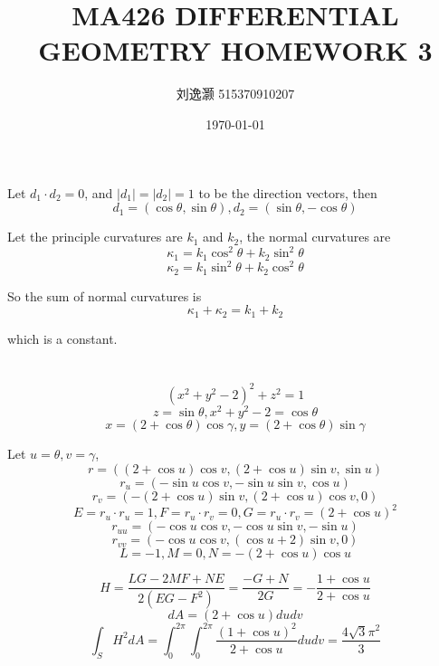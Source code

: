 \documentclass{article}
\title{MA426 DIFFERENTIAL GEOMETRY HOMEWORK 3}
\author{刘逸灏 515370910207}
\date{\today}
\begin{document}
\maketitle

\section{}
Let $d_1\cdot d_2=0$, and $|d_1|=|d_2|=1$ to be the direction vectors, then
$$d_1=(\cos\theta,\sin\theta),d_2=(\sin\theta,-\cos\theta)$$

Let the principle curvatures are $k_1$ and $k_2$, the normal curvatures are
$$\kappa_1=k_1\cos^2\theta+k_2\sin^2\theta$$
$$\kappa_2=k_1\sin^2\theta+k_2\cos^2\theta$$

So the sum of normal curvatures is
$$\kappa_1+\kappa_2=k_1+k_2$$

which is a constant.

\section{}
$$(x^2+y^2-2)^2+z^2=1$$
$$z=\sin\theta,x^2+y^2-2=\cos\theta$$
$$x=(2+\cos\theta)\cos\gamma,y=(2+\cos\theta)\sin\gamma$$

Let $u=\theta,v=\gamma$,
$$r=((2+\cos u)\cos v,(2+\cos u)\sin v,\sin u)$$
$$r_u=(-\sin u\cos v,-\sin u\sin v,\cos u)$$
$$r_v=(-(2+\cos u)\sin v,(2+\cos u)\cos v,0)$$
$$E=r_u\cdot r_u=1,F=r_u\cdot r_v=0,G=r_u\cdot r_v=(2+\cos u)^2$$
$$r_{uu}=(-\cos u\cos v,-\cos u\sin v,-\sin u)$$
$$r_{vv}=(-\cos u\cos v,(\cos u+2)\sin v,0)$$
$$L=-1,M=0,N=-(2+\cos u)\cos u$$

$$H=\frac{LG-2MF+NE}{2(EG-F^2)}=\frac{-G+N}{2G}=-\frac{1+\cos u}{2+\cos u}$$
$$dA=(2+\cos u)dudv$$
$$\int_S H^2dA=\int_0^{2\pi}\int_0^{2\pi}\frac{(1+\cos u)^2}{2+\cos u}dudv=\frac{4\sqrt{3}\pi^2}{3}$$

\section{}
\end{document}
